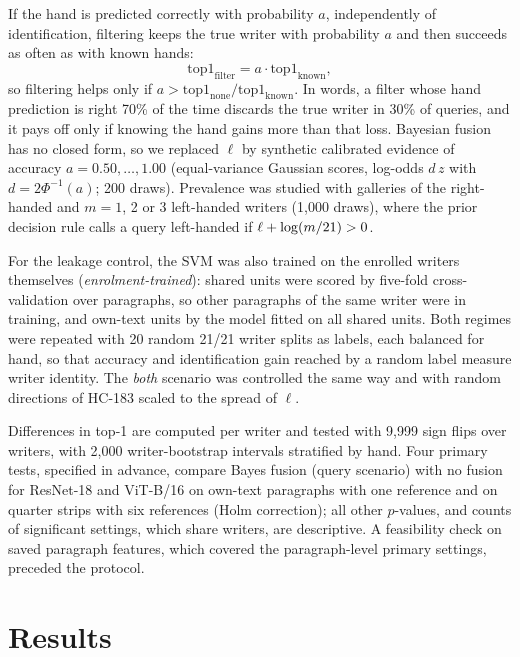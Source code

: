 \documentclass[conference]{IEEEtran}
\begin{document}
If the hand is predicted correctly with probability $a$, independently of identification, filtering keeps the true writer with probability $a$ and then succeeds as often as with known hands:
\begin{equation}
\mathrm{top1}_{\mathrm{filter}} = a \cdot \mathrm{top1}_{\mathrm{known}},
\label{eq:law}
\end{equation}
so filtering helps only if $a > \mathrm{top1}_{\mathrm{none}}/\mathrm{top1}_{\mathrm{known}}$. In words, a filter whose hand prediction is right 70\% of the time discards the true writer in 30\% of queries, and it pays off only if knowing the hand gains more than that loss. Bayesian fusion has no closed form, so we replaced $\ell$ by synthetic calibrated evidence of accuracy $a=0.50,\dots,1.00$ (equal-variance Gaussian scores, log-odds $d\,z$ with $d=2\Phi^{-1}(a)$; 200 draws). Prevalence was studied with galleries of the \vnRight{} right-handed and $m=1$, 2 or 3 left-handed writers (1,000 draws), where the prior decision rule calls a query left-handed if $\ell+\log(m/21)>0$.

For the leakage control, the SVM was also trained on the enrolled writers themselves (\emph{enrolment-trained}): shared units were scored by five-fold cross-validation over paragraphs, so other paragraphs of the same writer were in training, and own-text units by the model fitted on all shared units. Both regimes were repeated with 20 random 21/21 writer splits as labels, each balanced for hand, so that accuracy and identification gain reached by a random label measure writer identity. The \emph{both} scenario was controlled the same way and with random directions of HC-183 scaled to the spread of $\ell$.

Differences in top-1 are computed per writer and tested with 9,999 sign flips over writers, with 2,000 writer-bootstrap intervals stratified by hand. Four primary tests, specified in advance, compare Bayes fusion (query scenario) with no fusion for ResNet-18 and ViT-B/16 on own-text paragraphs with one reference and on quarter strips with six references (Holm correction); all other $p$-values, and counts of significant settings, which share writers, are descriptive. A feasibility check on saved paragraph features, which covered the paragraph-level primary settings, preceded the protocol.

\section{Results}
\end{document}

